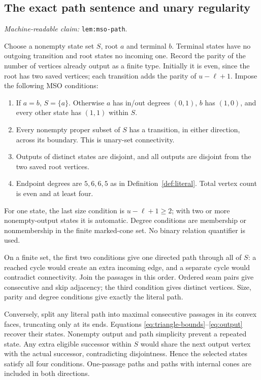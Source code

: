 \documentclass[11pt]{amsart}
\newcommand{\record}[1]{\nolinkurl{#1}}
\newcommand{\claimid}[1]{\par\nopagebreak\noindent\textit{Machine-readable claim:} \record{#1}.\par}
\theoremstyle{definition}\newtheorem{definition}{Definition}
\begin{document}
\subsection{The exact path sentence and unary regularity}\label{lem:mso-path}
\claimid{lem:mso-path}
Choose a nonempty state set $S$, root $a$ and terminal $b$. Terminal
states have no outgoing transition and root states no incoming one.
Record the parity of the number of vertices already output as a finite
type. Initially it is even, since the root has two saved vertices;
each transition adds the parity of $u-\ell+1$.
Impose the following MSO conditions:
\begin{enumerate}
\item If $a=b$, $S=\{a\}$. Otherwise $a$ has in/out degrees $(0,1)$,
      $b$ has $(1,0)$, and every other state has $(1,1)$ within $S$.
\item Every nonempty proper subset of $S$ has a transition, in either
      direction, across its boundary. This is unary-set connectivity.
\item Outputs of distinct states are disjoint, and all outputs are
      disjoint from the two saved root vertices.
\item Endpoint degrees are $5,6,6,5$ as in Definition~\ref{def:literal}.
      Total vertex count is even and at least four.
\end{enumerate}
For one state, the last size condition is $u-\ell+1\ge2$; with two
or more nonempty-output states it is automatic. Degree conditions are
membership or nonmembership in the finite marked-cone set. No binary
relation quantifier is used.

On a finite set, the first two conditions give one directed path
through all of $S$: a reached cycle would create an extra incoming edge,
and a separate cycle would contradict connectivity. Join the passages
in this order. Ordered seam pairs give consecutive and skip adjacency;
the third condition gives distinct vertices. Size, parity and degree
conditions give exactly the literal path.

Conversely, split any literal path into maximal consecutive passages
in its convex faces, truncating only at its ends. Equations
\eqref{eq:triangle-bounds}--\eqref{eq:output} recover their states.
Nonempty output and path simplicity prevent a repeated state. Any extra
eligible successor within $S$ would share the next output vertex with
the actual successor, contradicting disjointness. Hence the selected
states satisfy all four conditions. One-passage paths and paths with
internal cones are included in both directions.
\end{document}
